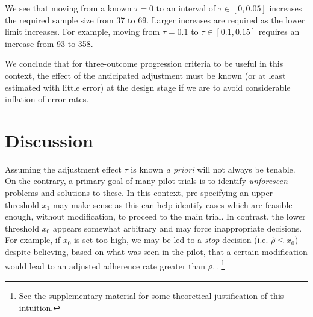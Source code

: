 \documentclass{bmcart}
\begin{document}
We see that moving from a known $\tau = 0$ to an interval of $\tau \in [0, 0.05]$ increases the required sample size from 37 to 69. Larger increases are required as the lower limit increases. For example,  moving from $\tau = 0.1$ to $\tau \in [0.1, 0.15]$ requires an increase from 93 to 358. 

We conclude that for three-outcome progression criteria to be useful in this context, the effect of the anticipated adjustment must be known (or at least estimated with little error) at the design stage if we are to avoid considerable inflation of error rates.

\section{Discussion}\label{sec:discussion}

Assuming the adjustment effect $\tau$ is known \emph{a priori} will not always be tenable. On the contrary, a primary goal of many pilot trials is to identify \emph{unforeseen} problems and solutions to these. In this context, pre-specifying an upper threshold $x_1$ may make sense as this can help identify cases which are feasible enough, without modification, to proceed to the main trial. In contrast, the lower threshold $x_0$ appears somewhat arbitrary and may force inappropriate decisions. For example, if $x_0$ is set too high, we may be led to a \emph{stop} decision (i.e. $\hat{\rho} \leq x_0$) despite believing, based on what was seen in the pilot, that a certain modification would lead to an adjusted adherence rate greater than $\rho_1$.
\footnote{See the supplementary material for some theoretical justification of this intuition.}



\end{document}
